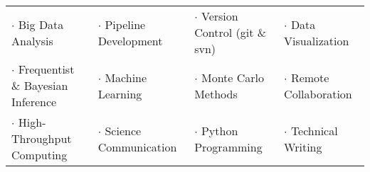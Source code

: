 
\vspace{-0.3cm}

\begin{cventries}

\setlength\tabcolsep{7pt}
\begin{tabular}{llll}
$\cdot$ \footnotesize{Big Data Analysis} & $\cdot$ \footnotesize{Pipeline Development} & $\cdot$ \footnotesize{Version Control (git \& svn)} & $\cdot$ \footnotesize{Data Visualization} \\
$\cdot$ \footnotesize{Frequentist \& Bayesian Inference} & $\cdot$ \footnotesize{Machine Learning} & $\cdot$ \footnotesize{Monte Carlo Methods} & $\cdot$ \footnotesize{Remote Collaboration} \\
$\cdot$ \footnotesize{High-Throughput Computing} & $\cdot$ \footnotesize{Science Communication} & $\cdot$ \footnotesize{Python Programming} & $\cdot$ \footnotesize{Technical Writing}   
\end{tabular}

\end{cventries}